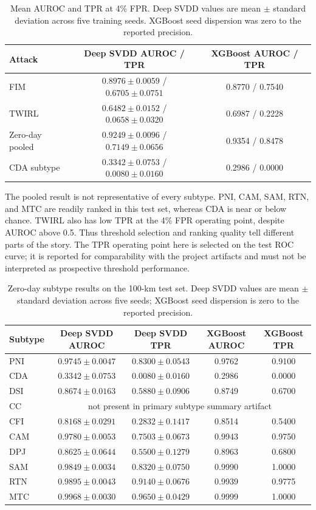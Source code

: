 \documentclass[12pt, a4paper]{report}
\begin{document}
\begin{table}[ht]
\centering
\caption{Mean AUROC and TPR at 4\% FPR. Deep SVDD values are mean $\pm$ standard deviation across five training seeds. XGBoost seed dispersion was zero to the reported precision.}
\label{tab:main}
\begin{tabular}{lcc}
\toprule
Attack & Deep SVDD AUROC / TPR & XGBoost AUROC / TPR\\
\midrule
FIM & $0.8976\pm0.0059$ / $0.6705\pm0.0751$ & 0.8770 / 0.7540\\
TWIRL & $0.6482\pm0.0152$ / $0.0658\pm0.0320$ & 0.6987 / 0.2228\\
Zero-day pooled & $0.9249\pm0.0096$ / $0.7149\pm0.0656$ & 0.9354 / 0.8478\\
CDA subtype & $0.3342\pm0.0753$ / $0.0080\pm0.0160$ & 0.2986 / 0.0000\\
\bottomrule
\end{tabular}
\end{table}

The pooled result is not representative of every subtype. PNI, CAM, SAM, RTN, and MTC are readily ranked in this test set, whereas CDA is near or below chance. TWIRL also has low TPR at the 4\% FPR operating point, despite AUROC above 0.5. Thus threshold selection and ranking quality tell different parts of the story. The TPR operating point here is selected on the test ROC curve; it is reported for comparability with the project artifacts and must not be interpreted as prospective threshold performance.

\begin{table}[ht]
\centering
\small
\caption{Zero-day subtype results on the 100-km test set. Deep SVDD values are mean $\pm$ standard deviation across five seeds; XGBoost seed dispersion is zero to the reported precision.}
\label{tab:subtypes}
\begin{tabular}{lcccc}
\toprule
Subtype & Deep SVDD AUROC & Deep SVDD TPR & XGBoost AUROC & XGBoost TPR \\
\midrule
PNI & $0.9745\pm0.0047$ & $0.8300\pm0.0543$ & 0.9762 & 0.9100 \\
CDA & $0.3342\pm0.0753$ & $0.0080\pm0.0160$ & 0.2986 & 0.0000 \\
DSI & $0.8674\pm0.0163$ & $0.5880\pm0.0906$ & 0.8749 & 0.6700 \\
CC & \multicolumn{4}{c}{not present in primary subtype summary artifact} \\
CFI & $0.8168\pm0.0291$ & $0.2832\pm0.1417$ & 0.8514 & 0.5400 \\
CAM & $0.9780\pm0.0053$ & $0.7503\pm0.0673$ & 0.9943 & 0.9750 \\
DPJ & $0.8625\pm0.0644$ & $0.5500\pm0.1279$ & 0.8963 & 0.6800 \\
SAM & $0.9849\pm0.0034$ & $0.8320\pm0.0750$ & 0.9990 & 1.0000 \\
RTN & $0.9895\pm0.0043$ & $0.9140\pm0.0676$ & 0.9939 & 0.9775 \\
MTC & $0.9968\pm0.0030$ & $0.9650\pm0.0429$ & 0.9999 & 1.0000 \\
\bottomrule
\end{tabular}
\end{table}
\end{document}

